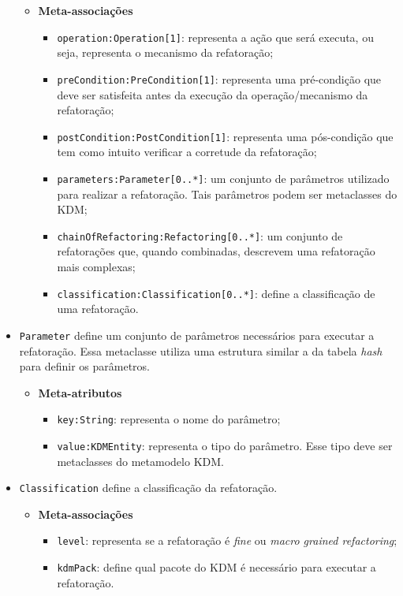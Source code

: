 \begin{itemize}
\begin{itemize}
	\item \textbf{Meta-associações}
		\begin{itemize}
			\item \texttt{operation:Operation[1]}: representa a ação que será executa, ou seja, representa o mecanismo da refatoração;
			\item \texttt{preCondition:PreCondition[1]}: representa uma pré-condição que deve ser satisfeita antes da execução da operação/mecanismo da refatoração;
			\item \texttt{postCondition:PostCondition[1]}: representa uma pós-condição que tem como intuito verificar a corretude da refatoração;
			\item \texttt{parameters:Parameter[0..*]}: um conjunto de parâmetros utilizado para realizar a refatoração. Tais parâmetros podem ser metaclasses do KDM;
			\item \texttt{chainOfRefactoring:Refactoring[0..*]}: um conjunto de refatorações que, quando combinadas, descrevem uma refatoração mais complexas;
			\item \texttt{classification:Classification[0..*]}: define a classificação de uma refatoração.
		\end{itemize}	
\end{itemize} 

\item \texttt{Parameter} define um conjunto de parâmetros necessários para executar a refatoração. Essa metaclasse utiliza uma estrutura similar a da tabela \textit{hash} para definir os parâmetros.

\begin{itemize}
	\item \textbf{Meta-atributos}
		\begin{itemize}
			\item \texttt{key:String}: representa o nome do parâmetro;
			\item \texttt{value:KDMEntity}: representa o tipo do parâmetro. Esse tipo deve ser metaclasses do metamodelo KDM.
		\end{itemize}	
\end{itemize} 

\item \texttt{Classification} define a classificação da refatoração.

\begin{itemize}
	\item \textbf{Meta-associações}
		\begin{itemize}
			\item \texttt{level}: representa se a refatoração é \textit{fine} ou \textit{macro grained refactoring};
			\item \texttt{kdmPack}: define qual pacote do KDM é necessário para executar a refatoração.
		\end{itemize}	
\end{itemize} 


\end{itemize}
